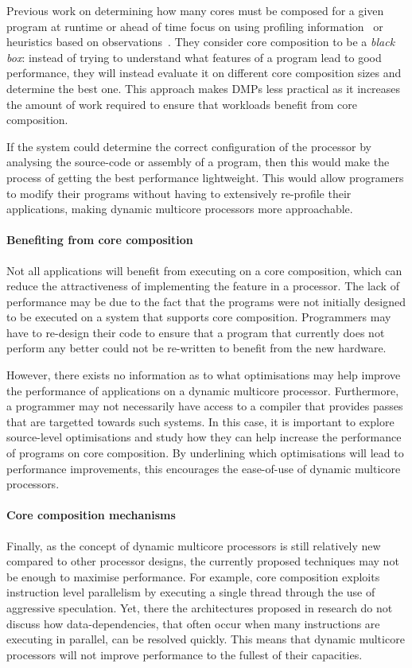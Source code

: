 Previous work on determining how many cores must be composed for a given program at runtime or ahead of time focus on using profiling information~\cite{pricopiSchedCoreComp2014} or heuristics based on observations~\cite{gulati2008multitaskingdmc}.
They consider core composition to be a \textit{black box}: instead of trying to understand what features of a program lead to good performance, they will instead evaluate it on different core composition sizes and determine the best one.
This approach makes DMPs less practical as it increases the amount of work required to ensure that workloads benefit from core composition.

If the system could determine the correct configuration of the processor by analysing the source-code or assembly of a program, then this would make the process of getting the best performance lightweight.
This would allow programers to modify their programs without having to extensively re-profile their applications, making dynamic multicore processors more approachable.

\paragraph*{Benefiting from core composition}
Not all applications will benefit from executing on a core composition, which can reduce the attractiveness of implementing the feature in a processor.
The lack of performance may be due to the fact that the programs were not initially designed to be executed on a system that supports core composition.
Programmers may have to re-design their code to ensure that a program that currently does not perform any better could not be re-written to benefit from the new hardware.

However, there exists no information as to what optimisations may help improve the performance of applications on a dynamic multicore processor.
Furthermore, a programmer may not necessarily have access to a compiler that provides passes that are targetted towards such systems.
In this case, it is important to explore source-level optimisations and study how they can help increase the performance of programs on core composition.
By underlining which optimisations will lead to performance improvements, this encourages the ease-of-use of dynamic multicore processors.

\paragraph*{Core composition mechanisms} 
Finally, as the concept of dynamic multicore processors is still relatively new compared to other processor designs, the currently proposed techniques may not be enough to maximise performance.
For example, core composition exploits instruction level parallelism by executing a single thread through the use of aggressive speculation.
Yet, there the architectures proposed in research do not discuss how data-dependencies, that often occur when many instructions are executing in parallel, can be resolved quickly.
This means that dynamic multicore processors will not improve performance to the fullest of their capacities.

